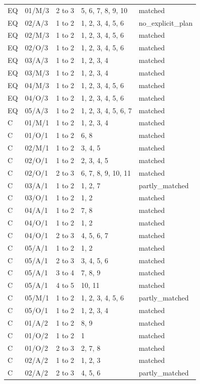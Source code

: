 \documentclass[10pt,a4paper]{article}
\begin{document}
{\begin{longtable}[]{@{}lllll@{}}
EQ & 01/M/3 & 2 to 3 & 5, 6, 7, 8, 9, 10 & matched \\
EQ & 02/A/3 & 1 to 2 & 1, 2, 3, 4, 5, 6 & no\_explicit\_plan \\
EQ & 02/M/3 & 1 to 2 & 1, 2, 3, 4, 5, 6 & matched \\
EQ & 02/O/3 & 1 to 2 & 1, 2, 3, 4, 5, 6 & matched \\
EQ & 03/A/3 & 1 to 2 & 1, 2, 3, 4 & matched \\
EQ & 03/M/3 & 1 to 2 & 1, 2, 3, 4 & matched \\
EQ & 04/M/3 & 1 to 2 & 1, 2, 3, 4, 5, 6 & matched \\
EQ & 04/O/3 & 1 to 2 & 1, 2, 3, 4, 5, 6 & matched \\
EQ & 05/A/3 & 1 to 2 & 1, 2, 3, 4, 5, 6, 7 & matched \\
C & 01/M/1 & 1 to 2 & 1, 2, 3, 4 & matched \\
C & 01/O/1 & 1 to 2 & 6, 8 & matched \\
C & 02/M/1 & 1 to 2 & 3, 4, 5 & matched \\
C & 02/O/1 & 1 to 2 & 2, 3, 4, 5 & matched \\
C & 02/O/1 & 2 to 3 & 6, 7, 8, 9, 10, 11 & matched \\
C & 03/A/1 & 1 to 2 & 1, 2, 7 & partly\_matched \\
C & 03/O/1 & 1 to 2 & 1, 2 & matched \\
C & 04/A/1 & 1 to 2 & 7, 8 & matched \\
C & 04/O/1 & 1 to 2 & 1, 2 & matched \\
C & 04/O/1 & 2 to 3 & 4, 5, 6, 7 & matched \\
C & 05/A/1 & 1 to 2 & 1, 2 & matched \\
C & 05/A/1 & 2 to 3 & 3, 4, 5, 6 & matched \\
C & 05/A/1 & 3 to 4 & 7, 8, 9 & matched \\
C & 05/A/1 & 4 to 5 & 10, 11 & matched \\
C & 05/M/1 & 1 to 2 & 1, 2, 3, 4, 5, 6 & partly\_matched \\
C & 05/O/1 & 1 to 2 & 1, 2, 3, 4 & matched \\
C & 01/A/2 & 1 to 2 & 8, 9 & matched \\
C & 01/O/2 & 1 to 2 & 1 & matched \\
C & 01/O/2 & 2 to 3 & 2, 7, 8 & matched \\
C & 02/A/2 & 1 to 2 & 1, 2, 3 & matched \\
C & 02/A/2 & 2 to 3 & 4, 5, 6 & partly\_matched \\

\end{longtable}}
\end{document}
